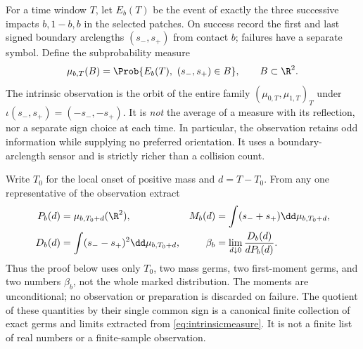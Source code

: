 For a time window $T$, let $E_b(T)$ be the event of exactly the three
successive impacts $b,1-b,b$ in the selected patches. On success record
the first and last signed boundary arclengths $(s_-,s_+)$ from contact
$b$; failures have a separate symbol. Define the subprobability measure
\begin{equation}\label{eq:intrinsicmeasure}
 \mu_{b,T}(B)=\Prob\{E_b(T),\ (s_-,s_+)\in B\},\qquad B\subset\R^2.
\end{equation}
The intrinsic observation is the orbit of the entire family
$(\mu_{0,T},\mu_{1,T})_T$ under
$\iota(s_-,s_+)=(-s_-,-s_+)$. It is \emph{not} the average of a
measure with its reflection, nor a separate sign choice at each time.
In particular, the observation retains odd information while supplying
no preferred orientation. It uses a boundary-arclength sensor and is
strictly richer than a collision count.

Write $T_0$ for the local onset of positive mass and $d=T-T_0$.
From any one representative of the observation extract
\begin{align}
 P_b(d)&=\mu_{b,T_0+d}(\R^2),&
 M_b(d)&=\int(s_-+s_+)\dd\mu_{b,T_0+d},\label{eq:arcdatum}\\
 D_b(d)&=\int(s_--s_+)^2\dd\mu_{b,T_0+d},&
 \beta_b&=\lim_{d\downarrow0}\frac{D_b(d)}{dP_b(d)}.\label{eq:betadef}
\end{align}
Thus the proof below uses only $T_0$, two mass germs, two first-moment
germs, and two numbers $\beta_b$, not the whole marked distribution.
The moments are unconditional; no observation or preparation is discarded
on failure. The quotient of these quantities by their single common sign
is a canonical finite collection of exact germs and limits extracted
from \eqref{eq:intrinsicmeasure}. It is not a finite list of real
numbers or a finite-sample observation.

